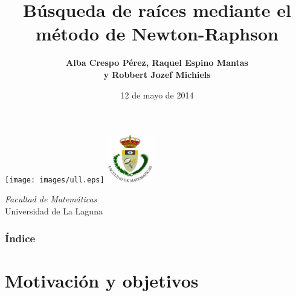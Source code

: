 \documentclass{beamer}
\title[Método de Newton]{Búsqueda de raíces mediante el método de Newton-Raphson}
\author[Técnicas Experimentales]{\textbf{Alba Crespo Pérez, Raquel Espino Mantas \\ y Robbert Jozef Michiels}}
\institute[ULL]{}
\date[12-05-2014]{12 de mayo de 2014}
\begin{document}
  

\begin{frame}

  \texttt{[image: images/ull.eps]}
  \hspace*{8cm}
  \includegraphics[width=0.15\textwidth]{images/fmatesc.eps}
  \titlepage

  \begin{small}
    \begin{center}
     \emph{Facultad de Matemáticas} \\
     Universidad de La Laguna
    \end{center}
  \end{small}

\end{frame}



\begin{frame}
  \frametitle{Índice}
  \tableofcontents[pausesections]
\end{frame}


\section{Motivación y objetivos}

\end{document}
